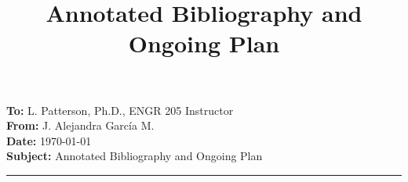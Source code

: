 \documentclass[12pt]{article}
\title{\textbf{\small Annotated Bibliography and Ongoing Plan }}
\begin{document}
\nocite{*}

\thispagestyle{plain}

\noindent \textbf{To:} L. Patterson, Ph.D., ENGR 205 Instructor  \\
\textbf{From:} J. Alejandra García M. \\
\textbf{Date:} \today \\
\textbf{Subject:} Annotated Bibliography and Ongoing Plan \\
\hrule 



   
\end{document}

